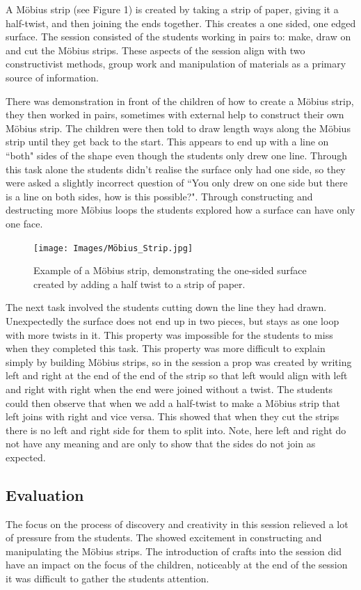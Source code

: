 \documentclass[11pt, a4paper, notitlepage]{article}
\begin{document}
A M\"obius strip (see Figure 1) is created by taking a strip of paper, giving it a half-twist, and then joining the ends together. This creates a one sided, one edged surface. The session consisted of the students working in pairs to: make, draw on and cut the M\"obius strips. These aspects of the session align with two constructivist methods, group work and manipulation of materials as a primary source of information. 
\par
There was demonstration in front of the children of how to create a M\"obius strip, they then worked in pairs, sometimes with external help to construct their own M\"obius strip. The children were then told to draw length ways along the M\"obius strip until they get back to the start. This appears to end up with a line on ``both" sides of the shape even though the students only drew one line. Through this task alone the students didn't realise the surface only had one side, so they were asked a slightly incorrect question of ``You only drew on one side but there is a line on both sides, how is this possible?". Through constructing and destructing more M\"obius loops the students explored how a surface can have only one face.
\begin{figure}[htbp]
\centering
\texttt{[image: Images/Möbius\_Strip.jpg]}
\caption{Example of a M\"obius strip, demonstrating the one-sided surface created by adding a half twist to a strip of paper.}
\end{figure}
\par
The next task involved the students cutting down the line they had drawn. Unexpectedly the surface does not end up in two pieces, but stays as one loop with more twists in it. This property was impossible for the students to miss when they completed this task. This property was more difficult to explain simply by building M\"obius strips, so in the session a prop was created by writing left and right at the end of the end of the strip so that left would align with left and right with right when the end were joined without a twist. The students could then observe that when we add a half-twist to make a M\"obius strip that left joins with right and vice versa. This showed that when they cut the strips there is no left and right side for them to split into. Note, here left and right do not have any meaning and are only to show that the sides do not join as expected. 
\subsection*{Evaluation}
The focus on the process of discovery and creativity in this session relieved a lot of pressure from the students. The showed excitement in constructing and manipulating the M\"obius strips. The introduction of crafts into the session did have an impact on the focus of the children, noticeably at the end of the session it was difficult to gather the students attention.
\end{document}
